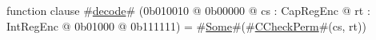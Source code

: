 function clause #\hyperref[zdecode]{decode}# (0b010010 @ 0b00000 @ cs : CapRegEnc @ rt : IntRegEnc @    0b01000 @ 0b111111) = #\hyperref[zSome]{Some}#(#\hyperref[zCCheckPerm]{CCheckPerm}#(cs, rt))
